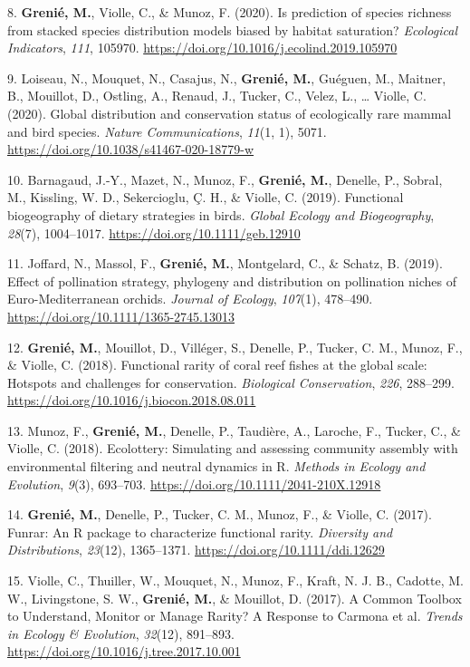 \documentclass[12pt,a4paper,]{article}
\newlength{\cslhangindent}
\newenvironment{CSLReferences}[2] %
 {\begin{list}{}{%
  \setlength{\itemindent}{0pt}
  \setlength{\leftmargin}{0pt}
  \setlength{\parsep}{0pt}
  \ifodd #1
   \setlength{\leftmargin}{\cslhangindent}
   \setlength{\itemindent}{-1\cslhangindent}
  \fi
  \setlength{\itemsep}{#2\baselineskip}}}
 {\end{list}}
\begin{document}
\begin{CSLReferences}{1}{0.5}
8. \textbf{Grenié, M.}, Violle, C., \& Munoz, F. (2020). Is prediction
of species richness from stacked species distribution models biased by
habitat saturation? \emph{Ecological Indicators}, \emph{111}, 105970.
\url{https://doi.org/10.1016/j.ecolind.2019.105970}

9. Loiseau, N., Mouquet, N., Casajus, N., \textbf{Grenié, M.}, Guéguen,
M., Maitner, B., Mouillot, D., Ostling, A., Renaud, J., Tucker, C.,
Velez, L., \ldots{} Violle, C. (2020). Global distribution and
conservation status of ecologically rare mammal and bird species.
\emph{Nature Communications}, \emph{11}(1, 1), 5071.
\url{https://doi.org/10.1038/s41467-020-18779-w}

10. Barnagaud, J.-Y., Mazet, N., Munoz, F., \textbf{Grenié, M.},
Denelle, P., Sobral, M., Kissling, W. D., Sekercioglu, Ç. H., \& Violle,
C. (2019). Functional biogeography of dietary strategies in birds.
\emph{Global Ecology and Biogeography}, \emph{28}(7), 1004--1017.
\url{https://doi.org/10.1111/geb.12910}

11. Joffard, N., Massol, F., \textbf{Grenié, M.}, Montgelard, C., \&
Schatz, B. (2019). Effect of pollination strategy, phylogeny and
distribution on pollination niches of Euro-Mediterranean orchids.
\emph{Journal of Ecology}, \emph{107}(1), 478--490.
\url{https://doi.org/10.1111/1365-2745.13013}

12. \textbf{Grenié, M.}, Mouillot, D., Villéger, S., Denelle, P.,
Tucker, C. M., Munoz, F., \& Violle, C. (2018). Functional rarity of
coral reef fishes at the global scale: Hotspots and challenges for
conservation. \emph{Biological Conservation}, \emph{226}, 288--299.
\url{https://doi.org/10.1016/j.biocon.2018.08.011}

13. Munoz, F., \textbf{Grenié, M.}, Denelle, P., Taudière, A., Laroche,
F., Tucker, C., \& Violle, C. (2018). Ecolottery: Simulating and
assessing community assembly with environmental filtering and neutral
dynamics in R. \emph{Methods in Ecology and Evolution}, \emph{9}(3),
693--703. \url{https://doi.org/10.1111/2041-210X.12918}

14. \textbf{Grenié, M.}, Denelle, P., Tucker, C. M., Munoz, F., \&
Violle, C. (2017). Funrar: An R package to characterize functional
rarity. \emph{Diversity and Distributions}, \emph{23}(12), 1365--1371.
\url{https://doi.org/10.1111/ddi.12629}

15. Violle, C., Thuiller, W., Mouquet, N., Munoz, F., Kraft, N. J. B.,
Cadotte, M. W., Livingstone, S. W., \textbf{Grenié, M.}, \& Mouillot, D.
(2017). A Common Toolbox to Understand, Monitor or Manage Rarity? A
Response to Carmona et al. \emph{Trends in Ecology \& Evolution},
\emph{32}(12), 891--893.
\url{https://doi.org/10.1016/j.tree.2017.10.001}

\end{CSLReferences}
\end{document}
